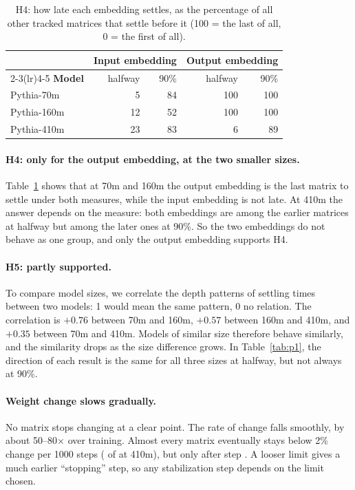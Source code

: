 \documentclass[11pt]{article}
\begin{document}
\begin{table}[t]
\centering\small
\begin{tabular}{l rr rr}
\toprule
 & \multicolumn{2}{c}{\textbf{Input embedding}} & \multicolumn{2}{c}{\textbf{Output embedding}} \\
\cmidrule(lr){2-3}\cmidrule(lr){4-5}
\textbf{Model} & halfway & 90\% & halfway & 90\% \\
\midrule
Pythia-70m  &  5 & 84 & 100 & 100 \\
Pythia-160m & 12 & 52 & 100 & 100 \\
Pythia-410m & 23 & 83 &   6 &  89 \\
\bottomrule
\end{tabular}
\caption{H4: how late each embedding settles, as the percentage of all other
tracked matrices that settle before it (100 = the last of all, 0 = the first
of all).}
\label{tab:h4}
\end{table}

\paragraph{H4: only for the output embedding, at the two smaller sizes.}
Table~\ref{tab:h4} shows that at 70m and 160m the output embedding is the last
matrix to settle under both measures, while the input embedding is not late.
At 410m the answer depends on the measure: both embeddings are among the
earlier matrices at halfway but among the later ones at 90\%. So the two
embeddings do not behave as one group, and only the output embedding supports
H4.

\paragraph{H5: partly supported.} To compare model sizes, we correlate the
depth patterns of settling times between two models: 1 would mean the same
pattern, 0 no relation. The correlation is $+0.76$ between 70m and 160m, $+0.57$ between
160m and 410m, and $+0.35$ between 70m and 410m. Models of similar size
therefore behave similarly, and the similarity drops as the size difference
grows. In Table~\ref{tab:p1}, the direction of each result is the same for all
three sizes at halfway, but not always at 90\%.

\paragraph{Weight change slows gradually.} No matrix stops changing at a clear
point. The rate of change falls smoothly, by about 50--80$\times$ over
training. Almost every matrix eventually stays below 2\% change per 1000 steps
(\TauBelowNHuge{} of \NMatHuge{} at 410m), but only after step
\TauBelowMinHuge{}. A looser limit gives a much earlier ``stopping'' step, so
any stabilization step depends on the limit chosen.
\end{document}
